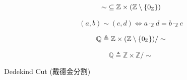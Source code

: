 \begin{frame}{}
  \begin{definition}
    \[
      \sim\; \subseteq \mathbb{Z} \times (\mathbb{Z} \setminus \{0_{\mathbb{Z}}\})
    \]

    \[
      (a, b) \sim (c, d) \iff a \cdot_{\mathbb{Z}} d = b \cdot_{\mathbb{Z}} c
    \]
  \end{definition}

  \pause
  \vspace{0.30cm}
  \begin{definition}[$\mathbb{Q}$]
    \[
      \mathbb{Q} \triangleq \mathbb{Z} \times (\mathbb{Z} \setminus \{0_{\mathbb{Z}}\})/\sim
    \]
  \end{definition}
\end{frame}

\begin{frame}{}
  \[
    \mathbb{Q} \triangleq \mathbb{Z} \times \mathbb{Z}/\sim
  \]
\end{frame}

\begin{frame}{}
  \begin{center}
  \end{center}

  \pause
  \begin{center}
    Dedekind Cut (戴德金分割)
  \end{center}

  \pause
  \vspace{0.30cm}
  \begin{center}
  \end{center}
\end{frame}
